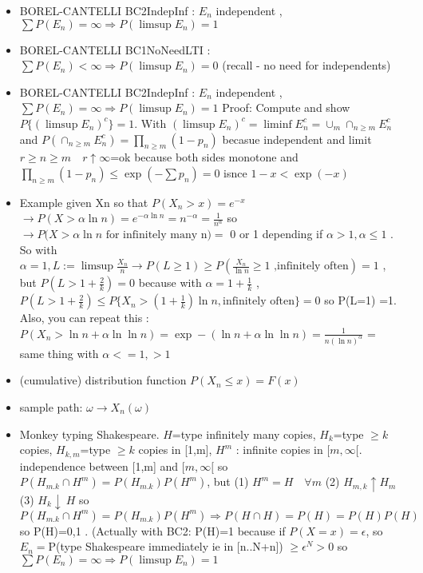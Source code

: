 \documentclass[10pt,landscape,a4paper]{article}
\begin{document}
\begin{multicols*}{3}
\begin{spacing}{0.5}
\begin{itemize}
\item \colorbox{blue!10}{BOREL-CANTELLI BC2IndepInf} : $E_n$ independent , $\sum P(E_n) = \infty \Rightarrow P(\limsup E_n)=1$

\item \colorbox{blue!10}{BOREL-CANTELLI BC1NoNeedLTI} : $ \sum P(E_n) < \infty \Rightarrow P(\limsup E_n) = 0 $ (recall - no need for independents)

\item \colorbox{blue!10}{BOREL-CANTELLI BC2IndepInf} : $E_n$ independent , $\sum P(E_n) = \infty \Rightarrow P(\limsup E_n)=1$ Proof: Compute and show $P \big\{ {(\limsup E_n)}^c \big\}=1$. With $ {(\limsup E_n)}^c = \liminf E_n^c = \cup_m \cap_{n \ge m} E_n^c$ and $P(\cap_{n \ge m} E_n^c)=\prod_{n \ge m} (1-p_n)$ becasue independent and limit $r\ge n \ge m \quad r \uparrow \infty$=ok because both sides monotone and $ \prod_{n \ge m} (1-p_n) \le \exp(-\sum p_n )=0$ isnce $1-x < \exp(-x)$

\item \colorbox{green!10}{Example} given Xn so that $P(X_n > x)=e^{-x}$ $\rightarrow P(X > \alpha \ln n) = e^{-\alpha \ln n}=n^{-\alpha} = \frac{1}{n^{\alpha}}$ so $\rightarrow P(X > \alpha \ln n \text{ for infinitely many n)} =$ 0 or 1 depending if $\alpha > 1, \alpha \le 1$ . So with $\alpha=1 , L := \limsup \frac{X_n}{n} \rightarrow P(L \ge 1) \ge P( \frac{X_n}{\ln n}  \ge 1 \text{ ,infinitely often} ) =1$ , but   $P(L>1+\frac{2}{k})=0$ because with $\alpha=1+\frac{1}{k}$ , $P(L>1+\frac{2}{k}) \le P \big\{ X_n > (1+\frac{1}{k}) \ln n, \text{infinitely often} \big\} =0 $ so P(L=1) =1. Also, you can repeat this : $P(X_n > \ln n + \alpha \ln \ln n) = \exp-(\ln n + \alpha \ln \ln n) = \frac{1}{n {(\ln n)}^{\alpha}} $ = same thing with $\alpha<=1 , > 1$ 

\item (cumulative) distribution function $P(X_n \le x) = F(x)$

\item sample path: $\omega \rightarrow X_n(\omega)$ 

\item \colorbox{green!10}{Monkey typing Shakespeare}. $H$=type infinitely many copies, $H_{k}$=type $\ge k$ copies, $H_{k,m}$=type $\ge k$ copies in [1,m], $H^{m}$ : infinite copies in $[m,\infty[$. independence between [1,m] and $[m,\infty[$ so $ P( H_{m.k} \cap H^m )= P (H_{m.k}) P (H^m) $, but (1) $H^m=H \quad \forall m$ (2) $H_{m,k} \uparrow H_m$ (3) $H_k \downarrow\ H$ so $ P( H_{m.k} \cap H^m )= P (H_{m.k}) P (H^m) \Rightarrow P(H \cap H) = P(H) = P(H) P(H) $ so P(H)=0,1 . (Actually  with BC2: P(H)=1 because if $P(X=x)=\epsilon$, so $E_n=$P(type Shakespeare immediately ie in [n..N+n]) $\ge \epsilon^N > 0$ so $\sum P(E_n)=\infty \Rightarrow P(\limsup E_n)=1$


\end{itemize}
\end{spacing}
\end{multicols*}
\end{document}

